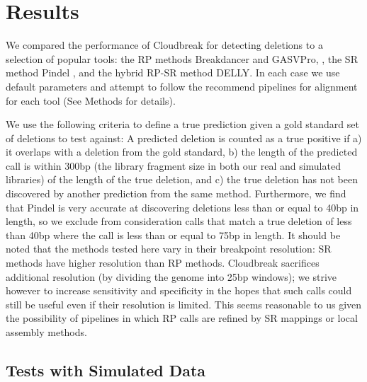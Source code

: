 \documentclass[11pt]{article}
\begin{document}
\section{Results}\label{results}

We compared the performance of Cloudbreak for detecting deletions to a selection of popular tools: the RP methods Breakdancer \autocite{Chen:2009p3} and GASVPro, \autocite{Sindi:2012kk}, the SR method Pindel \autocite{Ye:2009p2}, and the hybrid RP-SR method DELLY. \autocite{Rausch:2012he} In each case we use default parameters and attempt to follow the recommend pipelines for alignment for each tool (See Methods for details).

We use the following criteria to define a true prediction given a gold standard set of deletions to test against: A predicted deletion is counted as a true positive if a) it overlaps with a deletion from the gold standard, b) the length of the predicted call is within 300bp (the library fragment size in both our real and simulated libraries) of the length of the true deletion, and c) the true deletion has not been discovered by another prediction from the same method. Furthermore, we find that Pindel is very accurate at discovering deletions less than or equal to 40bp in length, so we exclude from consideration calls that match a true deletion of less than 40bp where the call is less than or equal to 75bp in length. It should be noted that the methods tested here vary in their breakpoint resolution: SR methods have higher resolution than RP methods. Cloudbreak sacrifices additional resolution (by dividing the genome into 25bp windows); we strive however to increase sensitivity and specificity in the hopes that such calls could still be useful even if their resolution is limited. This seems reasonable to us given the possibility of pipelines in which RP calls are refined by SR mappings or local assembly methods.

\subsection{Tests with Simulated Data}
\end{document}
